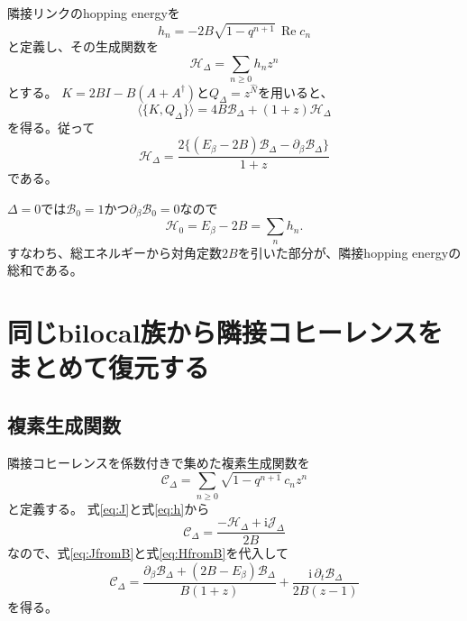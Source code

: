 \documentclass[a4paper,11pt]{ltjsarticle}
\numberwithin{equation}{section}
\newcommand{\ii}{\mathrm i}
\begin{document}
隣接リンクのhopping energyを
\begin{equation}
 h_n=-2B\sqrt{1-q^{n+1}}\,\operatorname{Re}c_n
 \label{eq:h}
\end{equation}
と定義し、その生成関数を
\begin{equation}
 \mathcal H_\Delta=\sum_{n\geq0}h_nz^n
 \label{eq:Hgen}
\end{equation}
とする。
$K=2BI-B(A+A^\dagger)$と$Q_\Delta=z^{\hat N}$を用いると、
\begin{equation}
 \langle\{K,Q_\Delta\}\rangle
 =4B\mathcal B_\Delta+(1+z)\mathcal H_\Delta
 \label{eq:antiKH}
\end{equation}
を得る。従って
\begin{equation}
 \boxed{\displaystyle
 \mathcal H_\Delta
 =\frac{2\{(E_\beta-2B)\mathcal B_\Delta-
 \partial_\beta\mathcal B_\Delta\}}{1+z}}
 \label{eq:HfromB}
\end{equation}
である。

$\Delta=0$では$\mathcal B_0=1$かつ$\partial_\beta\mathcal B_0=0$なので
\begin{equation}
 \mathcal H_0=E_\beta-2B=\sum_nh_n.
 \label{eq:limitH}
\end{equation}
すなわち、総エネルギーから対角定数$2B$を引いた部分が、隣接hopping energyの総和である。

\section{同じbilocal族から隣接コヒーレンスをまとめて復元する}
\subsection{複素生成関数}
隣接コヒーレンスを係数付きで集めた複素生成関数を
\begin{equation}
 \mathcal C_\Delta
 =\sum_{n\geq0}\sqrt{1-q^{n+1}}\,c_nz^n
 \label{eq:Cgen}
\end{equation}
と定義する。
式\eqref{eq:J}と式\eqref{eq:h}から
\begin{equation}
 \mathcal C_\Delta
 =\frac{-\mathcal H_\Delta+\ii\mathcal J_\Delta}{2B}
 \label{eq:CfromJH}
\end{equation}
なので、式\eqref{eq:JfromB}と式\eqref{eq:HfromB}を代入して
\begin{equation}
 \boxed{\displaystyle
 \mathcal C_\Delta
 =\frac{\partial_\beta\mathcal B_\Delta+(2B-E_\beta)\mathcal B_\Delta}
 {B(1+z)}
 +\frac{\ii\,\partial_t\mathcal B_\Delta}{2B(z-1)}}
 \label{eq:master}
\end{equation}
を得る。
\end{document}
